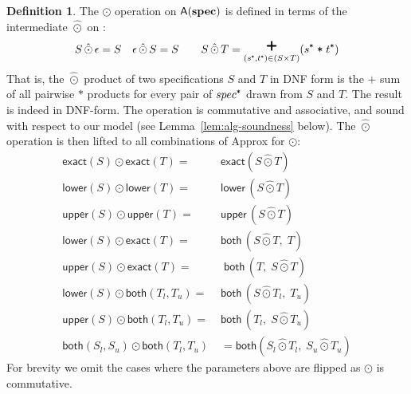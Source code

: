 \documentclass[9pt]{sigplanconf}
\newcounter{block}
\theoremstyle{definition}
\newtheorem{definition}[block]{Definition}
\newcommand{\term}[1]{\texttt{#1}}
\begin{document}
\begin{definition} The $\odot$ operation on $\textsf{A}(\textbf{spec}{})$
  is defined in terms of the intermediate $\hat{\odot}$ on \specDNF{}:
\begin{align*}
S \,\hat{\odot}\, \epsilon = S \quad
\epsilon \,\hat{\odot}\, S = S \qquad
S \,\hat{\odot}\, T = \bplus_{(\tyProd{s}, \tyProd{t}) \in (S \times
   T)} (\tyProd{s} \; \term{*} \; \tyProd{t})
\end{align*}
That is, the $\hat{\odot}$ product of two specifications $S$ and $T$ in DNF form 
is the $\term{+}$ sum of all pairwise $\term{*}$ products for every
pair of $\tyProd{spec}$ drawn from $S$ and $T$. The result
is indeed in DNF-form. The operation is
commutative and associative, and sound with respect to our
model (see Lemma~\ref{lem:alg-soundness} below).
The $\hat{\odot}$ operation is then lifted to all combinations of
\textsf{Approx} for $\odot$:
\begin{align*}
\textsf{exact}(S) \odot \textsf{exact}(T) = \; & \textsf{exact}(S
                                              \hat{\odot} T) \\
\textsf{lower}(S) \odot \textsf{lower}(T) = \; & 
      \textsf{lower} \, (S \hat{\odot} T) \\
\textsf{upper}(S) \odot \textsf{upper}(T) = \; &
      \textsf{upper} \, (S \hat{\odot} T) \\
\textsf{lower}(S) \odot \textsf{exact}(T) = \; &
       \textsf{both} \, (S \hat{\odot} T, \; T) \\
\textsf{upper}(S) \odot \textsf{exact}(T) = \; & 
      \; \textsf{both} \, (T, \; S \hat{\odot} T) \\
\textsf{lower}(S) \odot \textsf{both}(T_l,T_u) = \; &
        \textsf{both} \, (S \hat{\odot} T_l, \; T_u) \\
\textsf{upper}(S) \odot \textsf{both}(T_l,T_u) = \; & \textsf{both} \,
                                                      (T_l, \; S \hat{\odot} T_u) \\
\textsf{both}(S_l,S_u) \odot
\textsf{both}(T_l,T_u) & = \textsf{both} (S_l \hat{\odot} T_l, \; S_u
                         \hat{\odot} T_u)
\end{align*}
For brevity we omit the cases where the parameters above are flipped
as $\odot$ is commutative.
\end{definition}
\end{document}
